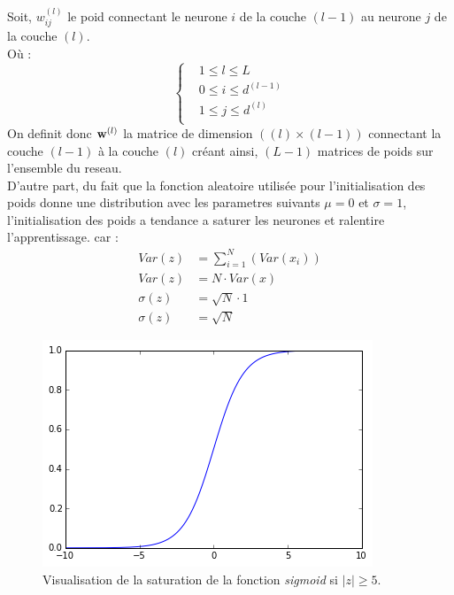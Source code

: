 \documentclass[11pt]{article}
\begin{document}
Soit, $w_{ij}^{(l)}$ le poid connectant le neurone $i$ de la couche $(l-1)$ au
neurone $j$ de la couche $(l)$. \\
O\`u :
\begin{equation}
	\left \{
	\begin{aligned}
		&1 \le l \le L \\
		&0 \le i \le d^{(l-1)} \\
		&1 \le j \le d^{(l)} \\
	\end{aligned}
	\right .
\end{equation}
On definit donc ${\bf w}^{(l)}$ la matrice de dimension $((l) \times (l-1))$
connectant la couche $(l-1)$ \`a la couche $(l)$ cr\'eant ainsi, $(L-1)$ matrices
de poids sur l'ensemble du reseau. \\

D'autre part, du fait que la fonction aleatoire utilis\'ee pour l'initialisation
des poids donne une distribution avec les parametres suivants $\mu=0$ et $\sigma=1$,
l'initialisation des poids a tendance a saturer les neurones et ralentire l'apprentissage.
car :
\begin{equation}
	\begin{aligned}
		Var(z) &= \sum_{i=1}^N(Var(x_i)) \\
		Var(z) &= N \cdot Var(x) \\
		\sigma(z) &= \sqrt{N} \cdot 1 \\
		\sigma(z) &= \sqrt{N}
	\end{aligned}
\end{equation}




\begin{figure}[htp]
	\centering
	\includegraphics[scale=.5]{img/sigmoid_sat.png}
	\caption{Visualisation de la saturation de la fonction \emph{sigmoid} si
	$|z| \ge 5$.}
\end{figure} \\
\end{document}
